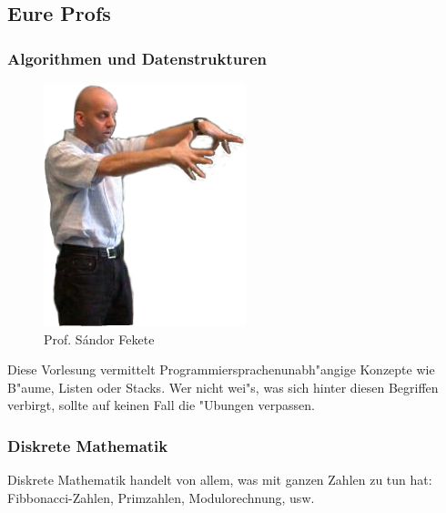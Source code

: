 \subsection{Eure Profs}

\subsubsection{Algorithmen und Datenstrukturen}

\begin{figure}[h]
	\centering\includegraphics[width=0.7\linewidth]{bilder/dozenten/fekete_frei.png}\\
	{Prof. S\'andor Fekete}
\end{figure}
Diese Vorlesung vermittelt Programmiersprachenunabh"angige Konzepte wie B"aume, Listen oder Stacks. Wer nicht wei"s, was sich hinter diesen Begriffen verbirgt, sollte auf keinen Fall die "Ubungen verpassen.


\subsubsection{Diskrete Mathematik}

Diskrete Mathematik handelt von allem, was mit ganzen Zahlen zu tun hat: Fibbonacci-Zahlen, Primzahlen, Modulorechnung, usw.


